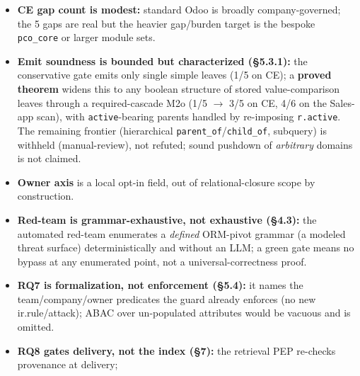 \documentclass[11pt,a4paper]{article}
\newcommand{\code}[1]{\texttt{#1}}
\begin{document}
\begin{itemize}[leftmargin=*]
{        unmodified upstream Odoo \code{sale.order}/\code{sale.order.line}} for the read plane (12/6 $\to$ 6/0), the
        write plane (3 structural confused-deputy mutations breach undefended, write-check holds all three, own
        write succeeds), AND a \textbf{scope matrix} \{owner, company\}$\times$\{draft, confirmed, locked\} that
        empirically maps the gap as \textbf{owner-axis-, child-rule-, draft-specific}: the company axis is natively
        governed (global multi-company rules), and confirming/locking additionally closes \code{create} (parent
        \code{message\_post}). The PEP is load-bearing exactly on the owner-axis create gap and never more permissive
        than native governance anywhere in the matrix. Remaining real-schema future work: the answer channel (out of
        any data-plane PEP scope) --- the confused-deputy write gap on this schema is now fully characterized.
  \item \textbf{CE gap count is modest:} standard Odoo is broadly company-governed; the 5 gaps are real but the
        heavier gap/burden target is the bespoke \code{pco_core} or larger module sets.
  \item \textbf{Emit soundness is bounded but characterized (\S5.3.1):} the conservative gate emits only single
        simple leaves (1/5 on CE); a \textbf{proved theorem} widens this to any boolean structure of stored
        value-comparison leaves through a required-cascade M2o (1/5 $\to$ 3/5 on CE, 4/6 on the Sales-app scan),
        with \code{active}-bearing parents handled by re-imposing \code{r.active}. The remaining frontier
        (hierarchical \code{parent_of}/\code{child_of}, subquery) is withheld (manual-review), not refuted;
        sound pushdown of \emph{arbitrary} domains is not claimed.
  \item \textbf{Owner axis} is a local opt-in field, out of relational-closure scope by construction.
  \item \textbf{Red-team is grammar-exhaustive, not exhaustive (\S4.3):} the automated red-team enumerates a
        \emph{defined} ORM-pivot grammar (a modeled threat surface) deterministically and without an LLM; a
        green gate means no bypass at any enumerated point, not a universal-correctness proof.
  \item \textbf{RQ7 is formalization, not enforcement (\S5.4):} it names the team/company/owner predicates the
        guard already enforces (no new ir.rule/attack); ABAC over un-populated attributes would be vacuous and
        is omitted.
  \item \textbf{RQ8 gates delivery, not the index (\S7):} the retrieval PEP re-checks provenance at delivery;

\end{itemize}
\end{document}

